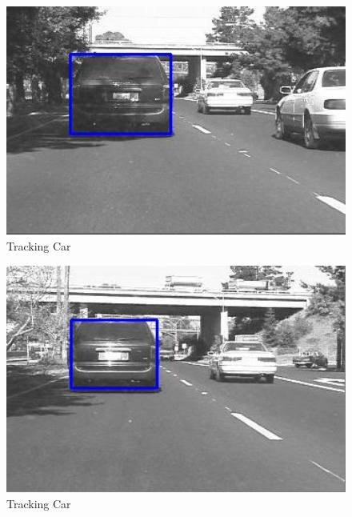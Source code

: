 \documentclass[12pt]{article}
\begin{document}
\begin{figure}[h]
    \centering
    \includegraphics[width=12cm]{trackcar1}
    \caption{Tracking Car}
    \label{fig:Tracking Car}
\end{figure}
\newpage
\begin{figure}[h]
    \centering
    \includegraphics[width=12cm]{trackcar2}
    \caption{Tracking Car}
    \label{fig:Tracking Cat}
\end{figure}
\end{document}
